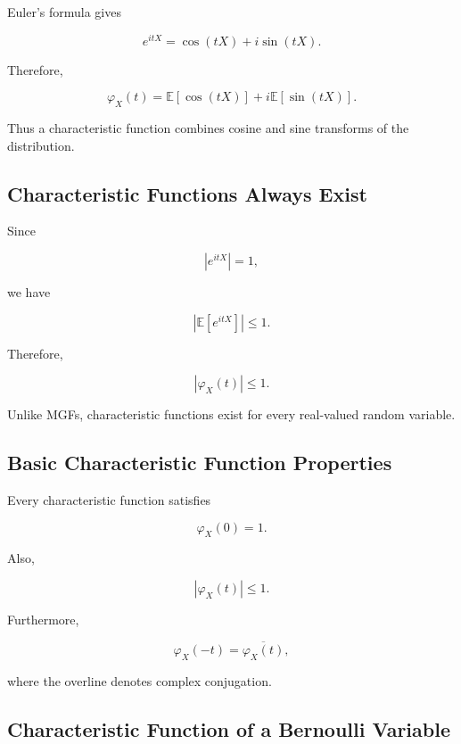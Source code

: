 Euler's formula gives

\[
e^{itX}
=
\cos(tX)
+
i\sin(tX).
\]

Therefore,

\[
\boxed{
\varphi_X(t)
=
\mathbb{E}[\cos(tX)]
+
i\mathbb{E}[\sin(tX)].
}
\]

Thus a characteristic function combines cosine and sine transforms of
the distribution.

\subsection{Characteristic Functions Always Exist}
\label{subsec:characteristic-functions-exist}

Since

\[
|e^{itX}|=1,
\]

we have

\[
\left|
\mathbb{E}[e^{itX}]
\right|
\leq1.
\]

Therefore,

\[
\boxed{
|\varphi_X(t)|\leq1.
}
\]

Unlike MGFs, characteristic functions exist for every real-valued random
variable.

\subsection{Basic Characteristic Function Properties}
\label{subsec:characteristic-basic-properties}

Every characteristic function satisfies

\[
\boxed{
\varphi_X(0)=1.
}
\]

Also,

\[
\boxed{
|\varphi_X(t)|\leq1.
}
\]

Furthermore,

\[
\boxed{
\varphi_X(-t)
=
\overline{\varphi_X(t)},
}
\]

where the overline denotes complex conjugation.

\subsection{Characteristic Function of a Bernoulli Variable}
\label{subsec:cf-bernoulli}


